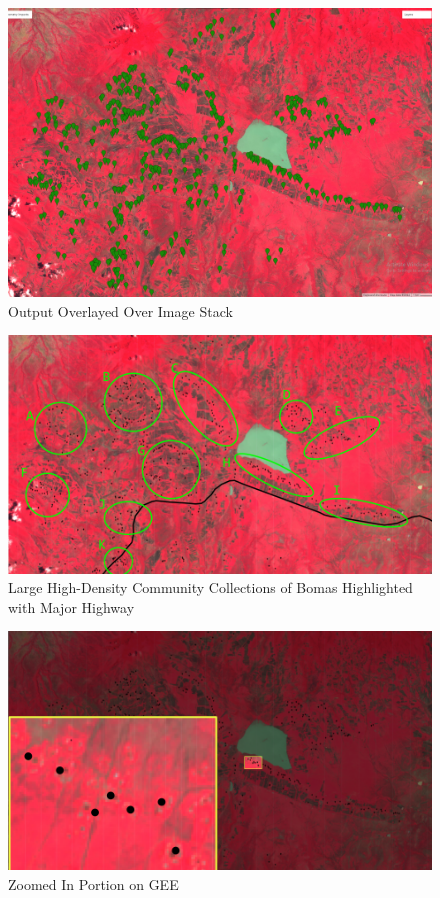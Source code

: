 \documentclass{article}
\begin{document}
\begin{figure}[H]
    \centering
    \includegraphics[width=1\linewidth]{images/Outputoverlayrealmap.png}
    \caption{Output Overlayed Over Image Stack}
    \label{fig:OverlayedMap}
\end{figure}

\begin{figure}[H]
    \centering
    \includegraphics[width=1\linewidth]{images/Communities and Highway Highlighted.png}
    \caption{Large High-Density Community Collections of Bomas Highlighted with Major Highway}
    \label{fig:Communities and Major Highway}
\end{figure}

\begin{figure}[H]
    \centering
    \includegraphics[width=1\linewidth]{images/zoomed in overlay.png}
    \caption{Zoomed In Portion on GEE}
    \label{fig:Zoomed_Overlayed}
\end{figure}
\end{document}
